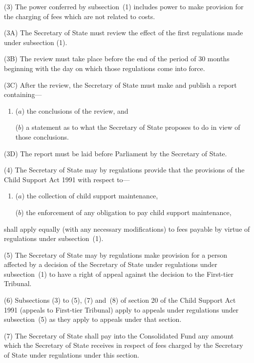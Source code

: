 \documentclass[12pt,a4paper]{article}
\begin{document}
(3) The power conferred by subsection~(1) includes power to make provision for the charging of fees which are not related to costs.

(3A) The Secretary of State must review the effect of the first regulations made under subsection (1).

(3B) The review must take place before the end of the period of 30 months beginning with the day on which those regulations come into force.

(3C) After the review, the Secretary of State must make and publish a report containing—
\begin{enumerate}\item[]
($a$) the conclusions of the review, and

($b$) a statement as to what the Secretary of State proposes to do in view of those conclusions.
\end{enumerate}

(3D) The report must be laid before Parliament by the Secretary of State.

(4) The Secretary of State may by regulations provide that the provisions of the Child Support Act 1991 with respect to—
\begin{enumerate}\item[]
($a$) the collection of child support maintenance,

($b$) the enforcement of any obligation to pay child support maintenance,
\end{enumerate}
shall apply equally (with any necessary modifications) to fees payable by virtue of regulations under subsection~(1).

(5) The Secretary of State may by regulations make provision for a person affected by a decision of the Secretary of State under regulations under subsection~(1) to have a right of appeal against the decision to the First-tier Tribunal.

(6) Subsections (3) to (5), (7) and~(8) of section 20 of the Child Support Act 1991 (appeals to First-tier Tribunal) apply to appeals under regulations under subsection~(5) as they apply to appeals under that section.

(7) The Secretary of State shall pay into the Consolidated Fund any amount which the Secretary of State receives in respect of fees charged by the Secretary of State under regulations under this section.
\end{document}
